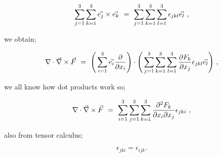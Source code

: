 \documentclass{article}
\begin{document}
\begin{equation} \label{eb-eq-51-23}
\sum_{j=1}^{3} \sum_{k=1}^{3} \vec{e_j}\times\vec{e_k} \hspace{0.125cm} = \hspace{0.125cm} \sum_{j=1}^{3} \sum_{k=1}^{3} \sum_{l=1}^{3} \epsilon_{jkl} \vec{e_l} \hspace{0.125cm},
\end{equation}

we obtain; 

\begin{equation} \label{eb-eq-51-24}
\nabla\cdot\vec{\nabla} \times \vec{F} \hspace{0.125cm} = \hspace{0.125cm} \Bigg( \sum_{i=1}^{3} \vec{e_{i}} \frac{\partial}{\partial x_i} \Bigg)\cdot\Bigg( \sum_{j=1}^{3} \sum_{k=1}^{3} \sum_{l=1}^{3} \frac{\partial{F_k}}{\partial x_j}  \epsilon_{jkl} \vec{e_l} \Bigg) \hspace{0.125cm} ,
\end{equation}

we all know how dot products work so;

\begin{equation} \label{eb-eq-51-25}
\nabla\cdot\vec{\nabla} \times \vec{F} \hspace{0.125cm} = \hspace{0.125cm} \sum_{i=1}^{3} \sum_{j=1}^{3} \sum_{k=1}^{3} \frac{\partial^{2}{F_k}}{\partial{x_i}\partial{x_j}} \epsilon_{jki} \hspace{0.125cm} ,
\end{equation}

also from tensor calculus;

\begin{equation} \label{eb-eq-51-26}
\epsilon_{jki} = \epsilon_{ijk} .
\end{equation}
\end{document}
